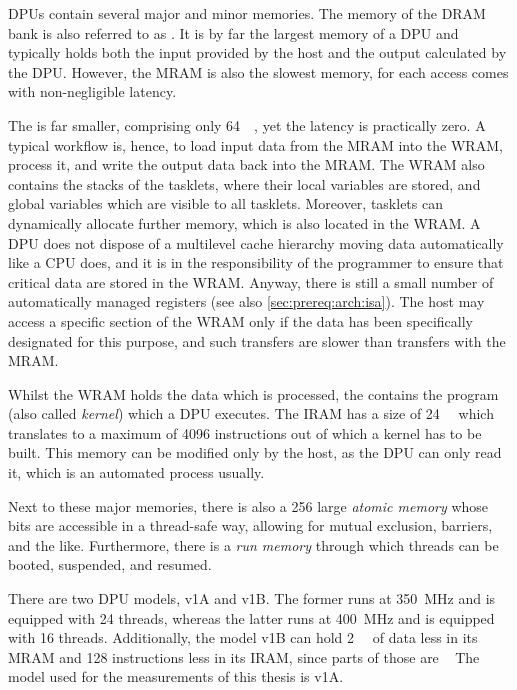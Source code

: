 \Acp{DPU} contain several major and minor memories.
The memory of the \ac{DRAM} bank is also referred to as .
It is by far the largest memory of a \ac{DPU} and typically holds both the input provided by the host and the output calculated by the \ac{DPU}.
However, the \ac{MRAM} is also the slowest memory, for each access comes with non-negligible latency.

The  is far smaller, comprising only \qty{64}{\kibi\byte}, yet the latency is practically zero.
A typical workflow is, hence, to load input data from the \ac{MRAM} into the \ac{WRAM}, process it, and write the output data back into the \ac{MRAM}.
The \ac{WRAM} also contains the stacks of the tasklets, where their local variables are stored, and global variables which are visible to all tasklets.
Moreover, tasklets can dynamically allocate further memory, which is also located in the \ac{WRAM}.
A \ac{DPU} does not dispose of a multilevel cache hierarchy moving data automatically like a \ac{CPU} does, and it is in the responsibility of the programmer to ensure that critical data are stored in the \ac{WRAM}.
Anyway, there is still a small number of automatically managed registers (see also \cref{sec:prereq:arch:isa}).
The host may access a specific section of the \ac{WRAM} only if the data has been specifically designated for this purpose, and such transfers are slower than transfers with the \ac{MRAM}.

Whilst the \ac{WRAM} holds the data which is processed, the  contains the program (also called \emph{kernel}) which a \ac{DPU} executes.
The \ac{IRAM} has a size of \qty{24}{\kibi\byte} which translates to a maximum of \num{4096} instructions out of which a kernel has to be built.
This memory can be modified only by the host, as the \ac{DPU} can only read it, which is an automated process usually.

Next to these major memories, there is also a \qty{256}{\bit} large \emph{atomic memory} whose bits are accessible in a thread-safe way, allowing for mutual exclusion, barriers, and the like.
Furthermore, there is a \emph{run memory} through which threads can be booted, suspended, and resumed.

\begin{note}
	There are two \ac{DPU} models, v1A and v1B.
	The former runs at \qty{350}{\mega\hertz} and is equipped with 24 threads, whereas the latter runs at \qty{400}{\mega\hertz} and is equipped with 16 threads.
	Additionally, the model v1B can hold \qty{2}{\kibi\byte} of data less in its \ac{MRAM} and 128 instructions less in its \ac{IRAM}, since parts of those are ~\cite[Introduction~-- DPU chip characteristics]{upmemSDK}
	The model used for the measurements of this thesis is v1A.
\end{note}
